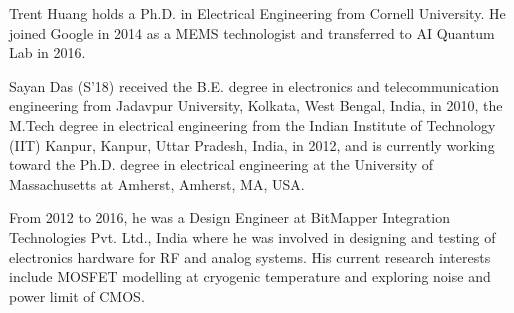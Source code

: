 \documentclass[journal]{IEEEtran}
\begin{document}
\begin{IEEEbiography}{Trent Huang} holds a Ph.D. in Electrical Engineering from Cornell University. He joined Google in 2014 as a MEMS technologist and transferred to AI Quantum Lab in 2016. 



\end{IEEEbiography}

\begin{IEEEbiography}{Sayan Das} (S'18) received the B.E. degree in electronics and telecommunication engineering from Jadavpur University, Kolkata, West Bengal, India, in 2010, the M.Tech degree in electrical engineering from the Indian Institute of Technology (IIT) Kanpur, Kanpur, Uttar Pradesh, India, in 2012, and is currently working toward the Ph.D. degree in electrical engineering at the University of Massachusetts at Amherst, Amherst, MA, USA. 

From 2012 to 2016, he was a Design Engineer at BitMapper Integration Technologies Pvt. Ltd., India where he was involved in designing and testing of electronics hardware for RF and analog systems. His current research interests include MOSFET modelling at cryogenic temperature and exploring noise and power limit of CMOS.


\end{IEEEbiography}
\end{document}
